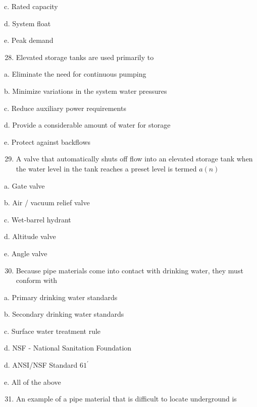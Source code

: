 \documentclass[10pt]{article}
\begin{document}
\begin{enumerate}
\begin{enumerate}
c. Rated capacity

d. System float

e. Peak demand

\begin{enumerate}
  \setcounter{enumi}{27}
  \item Elevated storage tanks are used primarily to
\end{enumerate}

a. Eliminate the need for continuous pumping

b. Minimize variations in the system water pressures

c. Reduce auxiliary power requirements

d. Provide a considerable amount of water for storage

e. Protect against backflows

\begin{enumerate}
  \setcounter{enumi}{28}
  \item A valve that automatically shuts off flow into an elevated storage tank when the water level in the tank reaches a preset level is termed $a(n)$
\end{enumerate}

a. Gate valve

b. Air / vacuum relief valve

c. Wet-barrel hydrant

d. Altitude valve

e. Angle valve

\begin{enumerate}
  \setcounter{enumi}{29}
  \item Because pipe materials come into contact with drinking water, they must conform with
\end{enumerate}

a. Primary drinking water standards

b. Secondary drinking water standards

c. Surface water treatment rule

d. NSF - National Sanitation Foundation

d. ANSI/NSF Standard $61^{\prime}$

e. All of the above

\begin{enumerate}
  \setcounter{enumi}{30}
  \item An example of a pipe material that is difficult to locate underground is
\end{enumerate}


\end{enumerate}
\end{enumerate}
\end{document}
